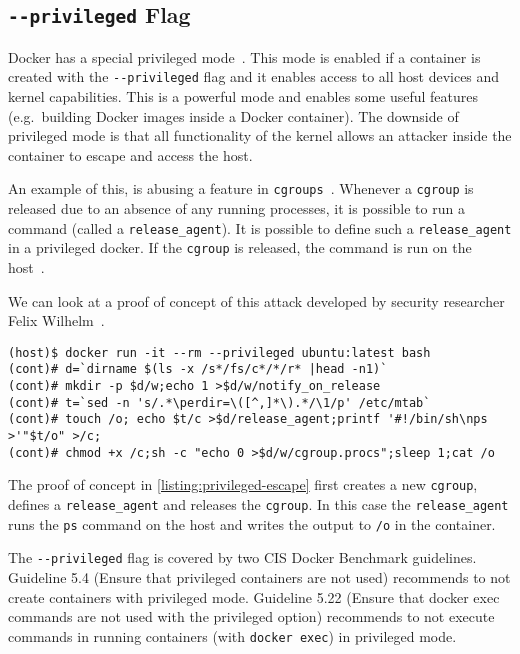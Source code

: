 \subsection{\texorpdfstring{\lstinline{--privileged}}{--privileged} Flag}\label{subsection:privileged}

Docker has a special privileged mode~\cite{Docker-in-Docker-blog}. This mode is enabled if a container is created with the \lstinline{--privileged} flag and it enables access to all host devices and kernel capabilities. This is a powerful mode and enables some useful features (e.g.\ building Docker images inside a Docker container). The downside of privileged mode is that all functionality of the kernel allows an attacker inside the container to escape and access the host.

\medskip

An example of this, is abusing a feature in \lstinline{cgroups}~\cite{CGroup-Docs}. Whenever a \lstinline{cgroup} is released due to an absence of any running processes, it is possible to run a command (called a \lstinline{release_agent}). It is possible to define such a \lstinline{release_agent} in a privileged docker. If the \lstinline{cgroup} is released, the command is run on the host~\cite{TrailOfBits-Docker-Escape}.

\medskip

We can look at a proof of concept of this attack developed by security researcher Felix Wilhelm~\cite{Felix-Wilhem-Tweet}.
\begin{lstlisting}[caption={Privileged container escape using \lstinline{cgroups}.},captionpos=b,label={listing:privileged-escape}]
(host)$ docker run -it --rm --privileged ubuntu:latest bash
(cont)# d=`dirname $(ls -x /s*/fs/c*/*/r* |head -n1)`
(cont)# mkdir -p $d/w;echo 1 >$d/w/notify_on_release
(cont)# t=`sed -n 's/.*\perdir=\([^,]*\).*/\1/p' /etc/mtab`
(cont)# touch /o; echo $t/c >$d/release_agent;printf '#!/bin/sh\nps >'"$t/o" >/c;
(cont)# chmod +x /c;sh -c "echo 0 >$d/w/cgroup.procs";sleep 1;cat /o
\end{lstlisting}

The proof of concept in \autoref{listing:privileged-escape} first creates a new \lstinline{cgroup}, defines a \lstinline{release_agent} and releases the \lstinline{cgroup}. In this case the \lstinline{release_agent} runs the \lstinline{ps} command on the host and writes the output to \lstinline{/o} in the container.

\medskip

The \lstinline{--privileged} flag is covered by two CIS Docker Benchmark guidelines. Guideline 5.4 (Ensure that privileged containers are not used) recommends to not create containers with privileged mode. Guideline 5.22 (Ensure that docker exec commands are not used with the privileged option) recommends to not execute commands in running containers (with \lstinline{docker exec}) in privileged mode.

